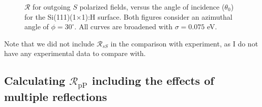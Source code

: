 \begin{figure}[H]
\centering
{}\hfill
{}
    \caption{$\mathcal{R}$ for outgoing $S$ polarized fields, versus the angle
    of incidence ($\theta_{0}$) for the Si(111)(1$\times$1):H surface. Both
    figures consider an azimuthal angle of $\phi = 30^{\circ}$. All curves are
    broadened with $\sigma = 0.075$ eV.}
\label{fig:1x1rS3d}
\end{figure}

Note that we did not include $\mathcal{R}_{sS}$ in the comparison with
experiment, as I do not have any experimental data to compare with.



\subsection{Calculating \texorpdfstring{$\mathcal{R}_{\mathrm{pP}}$}{RpP}
including the effects of multiple reflections}\label{sec:rifmr}

